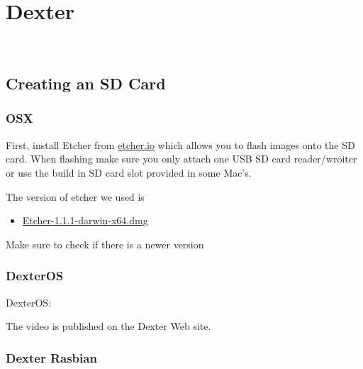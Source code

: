 

\chapter{Dexter}\label{dexter}

\FILENAME\

\section{Creating an SD Card}\label{creating-an-sd-card}

\subsection{OSX}\label{osx}

First, install Etcher from \href{https://etcher.io/}{etcher.io} which
allows you to flash images onto the SD card. When flashing make sure you
only attach one USB SD card reader/wroiter or use the build in SD card
slot provided in some Mac's.

The version of etcher we used is

\begin{itemize}
\item
  \href{https://github.com/resin-io/etcher/releases/download/v1.1.1/Etcher-1.1.1-darwin-x64.dmg}{Etcher-1.1.1-darwin-x64.dmg}
\end{itemize}



Make sure to check if there is a newer version

\subsection{DexterOS}

DexterOS:




The video is published on the Dexter Web site.

\subsection{Dexter Rasbian}\label{dexter-rasbian}

